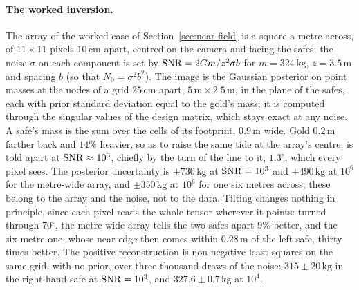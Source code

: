 \paragraph{The worked inversion.} The array of the worked case of
Section~\ref{sec:near-field} is a square a metre across, of $11\times11$ pixels $10\,\mathrm{cm}$
apart, centred on the camera and facing the safes; the noise $\sigma$ on each component
is set by $\mathrm{SNR} = 2Gm/z^2\sigma b$ for $m = 324\,\mathrm{kg}$, $z =
3.5\,\mathrm{m}$ and spacing $b$ (so that $N_0 = \sigma^2b^2$). The image is the Gaussian posterior on point
masses at the nodes of a grid $25\,\mathrm{cm}$ apart, $5\,\mathrm{m}\times
2.5\,\mathrm{m}$, in the plane of the safes, each with prior standard deviation
equal to the gold's mass; it is computed through the singular values of the
design matrix, which stays exact at any noise. A safe's mass is the sum over the
cells of its footprint, $0.9\,\mathrm{m}$ wide. Gold $0.2\,\mathrm{m}$ farther
back and $14\%$ heavier, so as to raise the same tide at the array's centre, is told
apart at $\mathrm{SNR} \approx 10^3$, chiefly by the turn of the line to it, $1.3^\circ$, which every pixel sees.
The posterior uncertainty is $\pm 730\,\mathrm{kg}$ at $\mathrm{SNR} = 10^3$ and $\pm
490\,\mathrm{kg}$ at $10^6$ for the metre-wide array, and $\pm 350\,\mathrm{kg}$
at $10^6$ for one six metres across; these belong to the array and the noise,
not to the data. Tilting changes nothing in principle, since each pixel reads
the whole tensor wherever it points: turned through $70^\circ$, the metre-wide
array tells the two safes apart $9\%$ better, and the six-metre one, whose near
edge then comes within $0.28\,\mathrm{m}$ of the left safe, thirty times better. The
positive reconstruction is non-negative least squares on the same grid, with no
prior, over three thousand draws of the noise: $315 \pm 20\,\mathrm{kg}$ in the
right-hand safe at $\mathrm{SNR} = 10^3$, and $327.6 \pm 0.7\,\mathrm{kg}$ at $10^4$.

